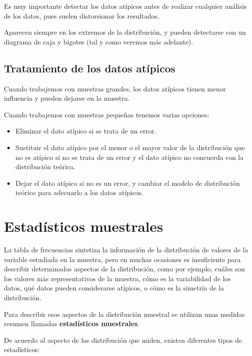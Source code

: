 \documentclass[
  spanish,
  a4paper,
]{scrreport}
\providecommand{\tightlist}{%
  \setlength{\itemsep}{0pt}\setlength{\parskip}{0pt}}
\theoremstyle{plain}
\theoremstyle{definition}
\theoremstyle{definition}
\theoremstyle{remark}
\begin{document}
Es muy importante detectar los datos atípicos antes de realizar
cualquier análisis de los datos, pues suelen distorsionar los
resultados.

Aparecen siempre en los extremos de la distribución, y pueden detectarse
con un diagrama de caja y bigotes (tal y como veremos más adelante).

\subsection{Tratamiento de los datos
atípicos}\label{tratamiento-de-los-datos-atuxedpicos}

Cuando trabajemos con muestras grandes, los datos atípicos tienen menor
influencia y pueden dejarse en la muestra.

Cuando trabajemos con muestras pequeñas tenemos varias opciones:

\begin{itemize}
\tightlist
\item
  Eliminar el dato atípico si se trata de un error.
\item
  Sustituir el dato atípico por el menor o el mayor valor de la
  distribución que no es atípico si no se trata de un error y el dato
  atípico no concuerda con la distribución teórica.
\item
  Dejar el dato atípico si no es un error, y cambiar el modelo de
  distribución teórico para adecuarlo a los datos atípicos.
\end{itemize}

\section{Estadísticos muestrales}\label{estaduxedsticos-muestrales}

La tabla de frecuencias sintetiza la información de la distribución de
valores de la variable estudiada en la muestra, pero en muchas ocasiones
es insuficiente para describir determinados aspectos de la distribución,
como por ejemplo, cuáles son los valores más representativos de la
muestra, cómo es la variabilidad de los datos, qué datos pueden
considerarse atípicos, o cómo es la simetría de la distribución.

Para describir esos aspectos de la distribución muestral se utilizan
unas medidas resumen llamadas \textbf{estadísticos muestrales}.

De acuerdo al aspecto de las distribución que miden, existen diferentes
tipos de estadísticos:
\end{document}
